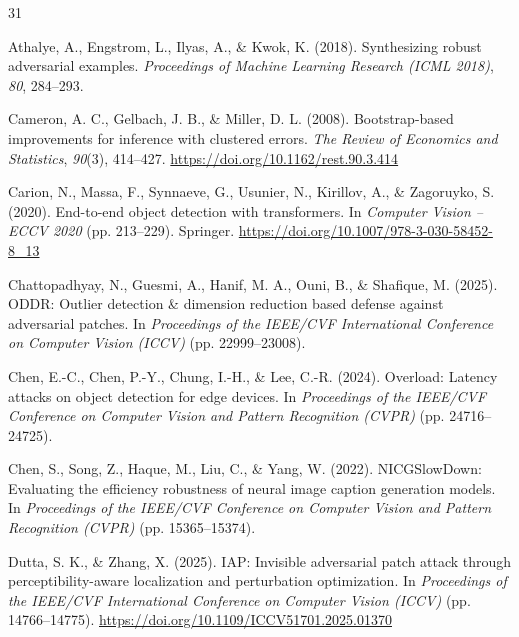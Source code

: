 \begin{thebibliography}{31}
\setlength{\itemsep}{2pt}

Athalye, A., Engstrom, L., Ilyas, A., \& Kwok, K. (2018). Synthesizing robust adversarial examples. \textit{Proceedings of Machine Learning Research (ICML 2018)}, \textit{80}, 284--293.

Cameron, A. C., Gelbach, J. B., \& Miller, D. L. (2008). Bootstrap-based improvements for inference with clustered errors. \textit{The Review of Economics and Statistics}, \textit{90}(3), 414--427. \url{https://doi.org/10.1162/rest.90.3.414}

Carion, N., Massa, F., Synnaeve, G., Usunier, N., Kirillov, A., \& Zagoruyko, S. (2020). End-to-end object detection with transformers. In \textit{Computer Vision -- ECCV 2020} (pp. 213--229). Springer. \url{https://doi.org/10.1007/978-3-030-58452-8_13}

Chattopadhyay, N., Guesmi, A., Hanif, M. A., Ouni, B., \& Shafique, M. (2025). ODDR: Outlier detection \& dimension reduction based defense against adversarial patches. In \textit{Proceedings of the IEEE/CVF International Conference on Computer Vision (ICCV)} (pp. 22999--23008).

Chen, E.-C., Chen, P.-Y., Chung, I.-H., \& Lee, C.-R. (2024). Overload: Latency attacks on object detection for edge devices. In \textit{Proceedings of the IEEE/CVF Conference on Computer Vision and Pattern Recognition (CVPR)} (pp. 24716--24725).

Chen, S., Song, Z., Haque, M., Liu, C., \& Yang, W. (2022). NICGSlowDown: Evaluating the efficiency robustness of neural image caption generation models. In \textit{Proceedings of the IEEE/CVF Conference on Computer Vision and Pattern Recognition (CVPR)} (pp. 15365--15374).

Dutta, S. K., \& Zhang, X. (2025). IAP: Invisible adversarial patch attack through perceptibility-aware localization and perturbation optimization. In \textit{Proceedings of the IEEE/CVF International Conference on Computer Vision (ICCV)} (pp. 14766--14775). \url{https://doi.org/10.1109/ICCV51701.2025.01370}


\end{thebibliography}
